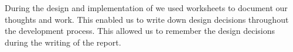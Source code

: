 During the design and implementation of \projectname{} we used worksheets to document our thoughts and work.
This enabled us to write down design decisions throughout the development process.
This allowed us to remember the design decisions during the writing of the report. \\










